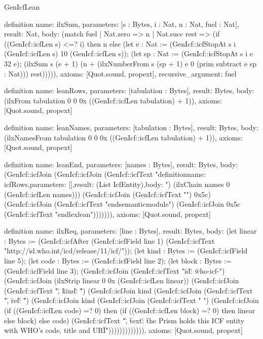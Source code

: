 \begin{lexlean}{GenIcfLean}
\begin{semanticmodule}
{definition{
  name: ilxSum,
  parameters: [s : Bytes, i : Nat, n : Nat, fuel : Nat],
  result: Nat,
  body: (match fuel
    | Nat.zero => n
    | Nat.succ rest => (if ((GenIcf::icfLen s) <=? i) then n else (let e : Nat := (GenIcf::icfStopAt s i (GenIcf::icfLen s) 10 (GenIcf::icfLen s)); (let sp : Nat := (GenIcf::icfStopAt s i e 32 e); (ilxSum s (e + 1) (n + (ilxNumberFrom s (sp + 1) e 0 (prim subtract e sp : Nat))) rest))))),
  axioms: [Quot.sound, propext],
  recursive_argument: fuel
}

definition{
  name: leanRows,
  parameters: [tabulation : Bytes],
  result: Bytes,
  body: (ilxFrom tabulation 0 0 0x ((GenIcf::icfLen tabulation) + 1)),
  axioms: [Quot.sound, propext]
}

definition{
  name: leanNames,
  parameters: [tabulation : Bytes],
  result: Bytes,
  body: (ilxNamesFrom tabulation 0 0 0x ((GenIcf::icfLen tabulation) + 1)),
  axioms: [Quot.sound, propext]
}

definition{
  name: leanEnd,
  parameters: [names : Bytes],
  result: Bytes,
  body: (GenIcf::icfJoin (GenIcf::icfJoin (GenIcf::icfText "definition{\n  name: icfRows,\n  parameters: [],\n  result: (List IcfEntity),\n  body: ") (ilxChain names 0 (GenIcf::icfLen names))) (GenIcf::icfJoin (GenIcf::icfText "\n}\n{}\n") 0x5c) (GenIcf::icfJoin (GenIcf::icfText "end{semanticmodule}\n") (GenIcf::icfJoin 0x5c (GenIcf::icfText "end{lexlean}\n"))))))),
  axioms: [Quot.sound, propext]
}

definition{
  name: ilxReq,
  parameters: [line : Bytes],
  result: Bytes,
  body: (let linear : Bytes := (GenIcf::icfAfter (GenIcf::icfField line 1) (GenIcf::icfText "http://id.who.int/icd/release/11/icf/")); (let kind : Bytes := (GenIcf::icfField line 5); (let code : Bytes := (GenIcf::icfField line 2); (let block : Bytes := (GenIcf::icfField line 3); (GenIcf::icfJoin (GenIcf::icfText "{\"id\": \"who-icf-") (GenIcf::icfJoin (ilxStrip linear 0 0x (GenIcf::icfLen linear)) (GenIcf::icfJoin (GenIcf::icfText "\", \"kind\": \"") (GenIcf::icfJoin kind (GenIcf::icfJoin (GenIcf::icfText "\", \"ref\": \"") (GenIcf::icfJoin kind (GenIcf::icfJoin (GenIcf::icfText " ") (GenIcf::icfJoin (if ((GenIcf::icfLen code) =? 0) then (if ((GenIcf::icfLen block) =? 0) then linear else block) else code) (GenIcf::icfText "\", \"text\": \"the Prism holds this ICF entity with WHO's code, title and URI\"}\n"))))))))))))),
  axioms: [Quot.sound, propext]
}

}
\end{semanticmodule}
\end{lexlean}
